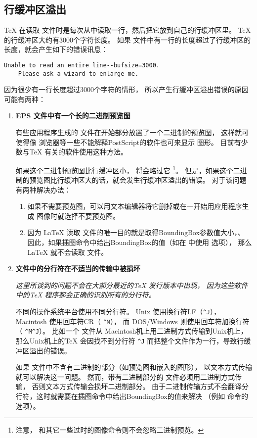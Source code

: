 \subsection[行缓冲区溢出]{行缓冲区溢出}\label{ssec:linebuffer}

\TeX{} 在读取 \ascii 文件时是每次从中读取一行，然后把它放到自己的行缓冲区里。
\TeX{} 的行缓冲区大约有3000个字符长度。
如果  文件中有一行的长度超过了行缓冲区的长度，就会产生如下的错误讯息：

\begin{Verbatim}[xleftmargin=22pt]
	Unable to read an entire line--bufsize=3000.
	Please ask a wizard to enlarge me.
\end{Verbatim}

因为很少有一行长度超过3000个字符的情形，
所以产生行缓冲区溢出错误的原因可能有两种：

\begin{enumerate}
	\item \textbf{ EPS 文件中有一个长的二进制预览图}

	有些应用程序生成的 文件在开始部分放置了一个二进制的预览图，
	这样就可使得像 浏览器等一些不能解释PostScript的软件也可来显示  图形。
	目前有少数与\TeX{} 有关的软件使用这种方法。
	
	如果这个二进制预览图比行缓冲区小， 将会略过它
	\footnote{注意， 和其它一些过时的图像命令则不会忽略二进制预览。}。
	但是，如果这个二进制的预览图比行缓冲区大的话，就会发生行缓冲区溢出的错误。
	对于该问题有两种解决办法：
	
	\begin{enumerate}
		\item 如果不需要预览图，可以用文本编辑器将它删掉或在一开始用应用程序生成 图像时就选择不要预览图。
		\item 因为 \LaTeX{} 读取  文件的唯一目的就是取得BoundingBox参数值大小，、
		因此，如果插图命令中给出BoundingBox的值（如在  中使用  选项），
		那么\LaTeX{} 就不会读取  文件。
	\end{enumerate}
	
	\item \textbf{ 文件中的分行符在不适当的传输中被损坏}
	
	\emph{这里所谈到的问题不会在大部分最近的\TeX{} 发行版本中出现，
		因为这些软件中的\TeX{} 程序都会正确的识别所有的分行符。}
	
	不同的操作系统平台使用不同分行符。
	Unix 使用换行符LF（\verb+^J+），
	Macintosh 使用回车符CR（ \verb+^M+），
	而 DOS/Windows 则使用回车符加换行符（ \verb+^M^J+）。
	比如一个 文件从 Macintosh机上用二进制方式传输到Unix机上，
	那么Unix机上的\TeX{} 会因找不到分行符 \verb+^J+ 而把整个文件作为一行，导致行缓冲区溢出的错误。
	
	如果 文件中不含有二进制的部分（如预览图和嵌入的图形），
	以文本方式传输就可以解决这一问题。
	然而，带有二进制部分的  文件必须用二进制方式传输，
	否则文本方式传输会损坏二进制部分。
	由于二进制传输方式不会翻译分行符，这时就需要在插图命令中给出BoundingBox的值来解决
	（例如 命令的  选项）。
\end{enumerate}


